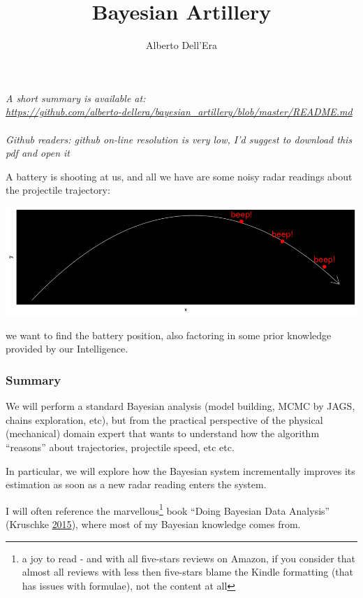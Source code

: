 \documentclass[]{article}
\title{Bayesian Artillery}
\author{Alberto Dell'Era}
\date{}
\begin{document}
\maketitle

\emph{A short summary is available at:\\
\url{https://github.com/alberto-dellera/bayesian_artillery/blob/master/README.md}
}~\\
\emph{Github readers: github on-line resolution is very low, I'd suggest
to download this pdf and open it}

A battery is shooting at us, and all we have are some noisy radar
readings about the projectile trajectory:

\includegraphics{static_images/simulate_cartoon-1.png}

we want to find the battery position, also factoring in some prior
knowledge provided by our Intelligence.

\hypertarget{summary}{%
\subsubsection{Summary}\label{summary}}

We will perform a standard Bayesian analysis (model building, MCMC by
JAGS, chains exploration, etc), but from the practical perspective of
the physical (mechanical) domain expert that wants to understand how the
algorithm ``reasons'' about trajectories, projectile speed, etc etc.

In particular, we will explore how the Bayesian system incrementally
improves its estimation as soon as a new radar reading enters the
system.

I will often reference the marvellous\footnote{a joy to read - and with
  all five-stars reviews on Amazon, if you consider that almost all
  reviews with less then five-stars blame the Kindle formatting (that
  has issues with formulae), not the content at all} book ``Doing
Bayesian Data Analysis'' (Kruschke
\protect\hyperlink{ref-DBDA2E}{2015}), where most of my Bayesian
knowledge comes from.
\end{document}
